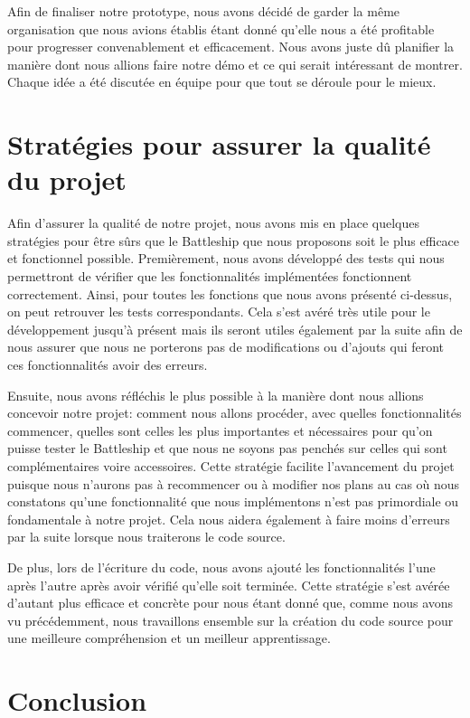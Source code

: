 \documentclass[12pt]{article}
\begin{document}
Afin de finaliser notre prototype, nous avons décidé de garder la même organisation que nous avions établis étant donné qu'elle nous a été profitable pour progresser convenablement et efficacement. Nous avons juste dû planifier la manière dont nous allions faire notre démo et ce qui serait intéressant de montrer. Chaque idée a été discutée en équipe pour que tout se déroule pour le mieux.

\section{Stratégies pour assurer la qualité du projet}

Afin d'assurer la qualité de notre projet, nous avons mis en place quelques stratégies pour être sûrs que le Battleship que nous proposons soit le plus efficace et fonctionnel possible. Premièrement, nous avons développé des tests qui nous permettront de vérifier que les fonctionnalités implémentées fonctionnent correctement. Ainsi, pour toutes les fonctions que nous avons présenté ci-dessus, on peut retrouver les tests correspondants. Cela s'est avéré très utile pour le développement jusqu'à présent mais ils seront utiles également par la suite afin de nous assurer que nous ne porterons pas de modifications ou d'ajouts qui feront ces fonctionnalités avoir des erreurs.

Ensuite, nous avons réfléchis le plus possible à la manière dont nous allions concevoir notre projet: comment nous allons procéder, avec quelles fonctionnalités commencer, quelles sont celles les plus importantes et nécessaires pour qu'on puisse tester le Battleship et que nous ne soyons pas penchés sur celles qui sont complémentaires voire accessoires. Cette stratégie facilite l'avancement du projet puisque nous n'aurons pas à recommencer ou à modifier nos plans au cas où nous constatons qu'une fonctionnalité que nous implémentons n'est pas primordiale ou fondamentale à notre projet. Cela nous aidera également à faire moins d'erreurs par la suite lorsque nous traiterons le code source.

De plus, lors de l'écriture du code, nous avons ajouté les fonctionnalités l'une après l'autre après avoir vérifié qu'elle soit terminée. Cette stratégie s'est avérée d'autant plus efficace et concrète pour nous étant donné que, comme nous avons vu précédemment, nous travaillons ensemble sur la création du code source pour une meilleure compréhension et un meilleur apprentissage.

\section{Conclusion}
\end{document}
